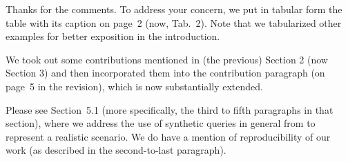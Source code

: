 \documentclass[10pt,letterpaper]{article}
\newenvironment{myindentpar}[1]%
{\begin{list}{}
         {\vspace{10pt}
					\setlength{\leftmargin}{#1}}
          \item[]
}
{\end{list}}
\newcommand{\rev}[1]{\begin{myindentpar}{.25in} {\em {\color{blue}{#1}}}\end{myindentpar}}
\begin{document}
\rev{
The table in Page3 does not have any caption to introduces besides, its location is badly organized.
}

Thanks for the comments. To address your concern, we put in tabular form the table with its caption on page~2 (now, {\color{blue}Tab.~2}). 
Note that we tabularized other examples for better exposition in the introduction.

\rev{
The main contribution of the paper is so limited and needs to be extended in Section 1. 
} 

We took out some contributions mentioned in (the previous) Section 2 (now Section 3) and then incorporated them into the contribution paragraph (on page~5 
in the revision), which is now substantially extended. 

\rev{ 
In the experiment environmental setting, the deployment in realistic datasets are missing and must be indicated for the reproduction of the future readers.  
}

Please see Section~5.1 (more specifically, the third to fifth paragraphs in that section), where we address the use of synthetic queries in general from to represent a realistic scenario. We do have a mention of reproducibility of our work (as described in the second-to-last paragraph).
\end{document}

